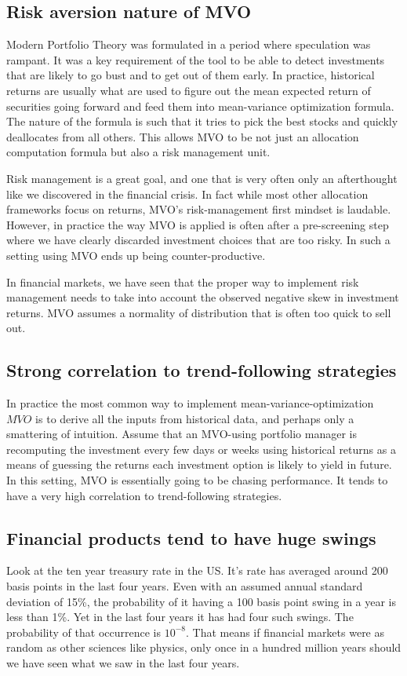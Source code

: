 \documentclass[a4paper]{article}
\begin{document}
\subsection{Risk aversion nature of MVO\label{risk-aversion}}
Modern Portfolio Theory was formulated in a period where speculation was rampant. It was a key requirement of the tool to be able to detect investments that are likely to go bust and to get out of them early. In practice, historical returns are usually what are used to figure out the mean expected return of securities going forward and feed them into mean-variance optimization formula. The nature of the formula is such that it tries to pick the best stocks and quickly deallocates from all others. This allows MVO to be not just an allocation computation formula but also a risk management unit.

Risk management is a great goal, and one that is very often only an afterthought like we discovered in the financial crisis. In fact while most other allocation frameworks focus on returns, MVO's risk-management first mindset is laudable. However, in practice the way MVO is applied is often after a pre-screening step where we have clearly discarded investment choices that are too risky. In such a setting using MVO ends up being counter-productive. 

In financial markets, we have seen that the proper way to implement risk management needs to take into account the observed negative skew in investment returns. MVO assumes a normality of distribution that is often too quick to sell out.
\subsection{Strong correlation to trend-following strategies}
In practice the most common way to implement mean-variance-optimization \(MVO\) is to derive all the inputs from historical data, and perhaps only a smattering of intuition. Assume that an MVO-using portfolio manager is recomputing the investment every few days or weeks using historical returns as a means of guessing the returns each investment option is likely to yield in future. In this setting, MVO is essentially going to be chasing performance. It tends to have a very high correlation to trend-following strategies.
\subsection{Financial products tend to have huge swings}
Look at the ten year treasury rate in the US. It's rate has averaged around 200 basis points in the last four years. Even with an assumed annual standard deviation of 15\%, the probability of it having a 100 basis point swing in a year is less than 1\%. Yet in the last four years it has had four such swings. The probability of that occurrence is $10^{-8}$. That means if financial markets were as random as other sciences like physics, only once in a hundred million years should we have seen what we saw in the last four years.
\end{document}
